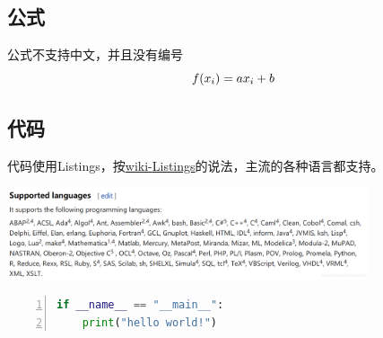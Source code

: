 \documentclass[UTF8]{ctexart}
\newenvironment{marktext}{}{}
\begin{document}
\begin{marktext}
\subsection{公式}


公式不支持中文，并且没有编号
\end{marktext}
\[
\\ f(x_i)=ax_i+b\\ \\
\]
\begin{marktext}


\subsection{代码}


代码使用Listings，按\href{https://en.wikibooks.org/wiki/LaTeX/Source_Code_Listings}{wiki{-}Listings}的说法，主流的各种语言都支持。
\begin{center}
\begin{marktext}
\vspace{\baselineskip}\includegraphics[width=0.8\textwidth]{images/53bb9cd2ced62c6673f39073ca9397b7.png}\vspace{\baselineskip}
\end{marktext}
\end{center}
\end{marktext}
\begin{lstlisting}[language={Python},keywordstyle=\color{blue!70},frame=shadowbox,showstringspaces=false,commentstyle=\color{red!50!green!50!blue!50},escapeinside=``,numbers=left,numberstyle=\small,basicstyle=\small]
if __name__ == "__main__":
	print("hello world!")
\end{lstlisting}
\end{document}
